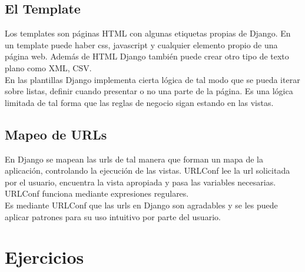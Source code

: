 \subsection*{El Template}

Los templates son páginas HTML con algunas etiquetas propias de Django. En un template puede haber css, javascript y cualquier elemento propio de una página web. Además de HTML Django también puede crear otro tipo de texto plano como XML, CSV.\\

En las plantillas Django implementa cierta lógica de tal modo que se pueda iterar sobre listas, definir cuando presentar o no una parte de la página. Es una lógica limitada de tal forma que las reglas de negocio sigan estando en las vistas.

\subsection{Mapeo de URLs}

En Django se mapean las urls de tal manera que forman un mapa de la aplicación, controlando la ejecución de las vistas. URLConf lee la url solicitada por el usuario, encuentra la vista apropiada y pasa las variables necesarias. URLConf funciona mediante expresiones regulares.\\

Es mediante URLConf que las urls en Django son agradables y se les puede aplicar patrones para su uso intuitivo por parte del usuario.\\


\section{Ejercicios}

